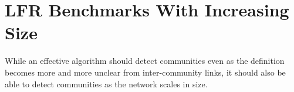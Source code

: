 








\section{LFR Benchmarks With Increasing Size}
While an effective algorithm should detect communities even as the definition becomes more and more unclear from inter-community links, it should also be able to detect communities as the network scales in size. 


